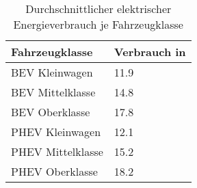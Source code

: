 {
\renewcommand{\arraystretch}{1.2}%
\begin{table}[H]
	\begin{center}
		\caption{Durchschnittlicher elektrischer Energieverbrauch je Fahrzeugklasse}
		\begin{tabu} to 0.6\textwidth {X[1] X[1.2, r]}
			\hline
			Fahrzeugklasse    & Verbrauch in \si{\kwhkm} \\ \hline
			BEV Kleinwagen    & \num{11.9}              \\
			BEV Mittelklasse  & \num{14.8}              \\
			BEV Oberklasse    & \num{17.8}              \\
			PHEV Kleinwagen   & \num{12.1}              \\
			PHEV Mittelklasse & \num{15.2}              \\
			PHEV Oberklasse   & \num{18.2}              \\ \hline
		\end{tabu}
		\label{tab:TechVerbrauch}
	\end{center}
	\vspace{-3mm}%
\end{table}
}